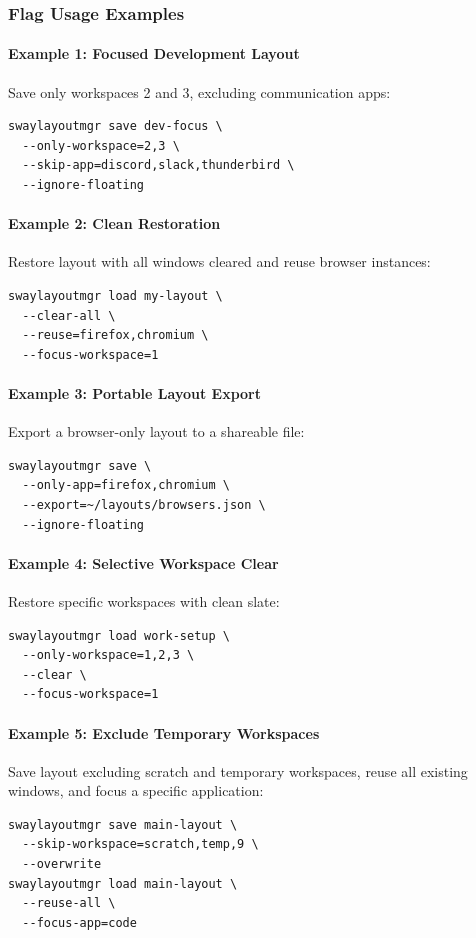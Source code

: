 \subsubsection{Flag Usage Examples}

\paragraph{Example 1: Focused Development Layout}
Save only workspaces 2 and 3, excluding communication apps:
\begin{verbatim}
swaylayoutmgr save dev-focus \
  --only-workspace=2,3 \
  --skip-app=discord,slack,thunderbird \
  --ignore-floating
\end{verbatim}

\paragraph{Example 2: Clean Restoration}
Restore layout with all windows cleared and reuse browser instances:
\begin{verbatim}
swaylayoutmgr load my-layout \
  --clear-all \
  --reuse=firefox,chromium \
  --focus-workspace=1
\end{verbatim}

\paragraph{Example 3: Portable Layout Export}
Export a browser-only layout to a shareable file:
\begin{verbatim}
swaylayoutmgr save \
  --only-app=firefox,chromium \
  --export=~/layouts/browsers.json \
  --ignore-floating
\end{verbatim}

\paragraph{Example 4: Selective Workspace Clear}
Restore specific workspaces with clean slate:
\begin{verbatim}
swaylayoutmgr load work-setup \
  --only-workspace=1,2,3 \
  --clear \
  --focus-workspace=1
\end{verbatim}

\paragraph{Example 5: Exclude Temporary Workspaces}
Save layout excluding scratch and temporary workspaces, reuse all existing windows, and focus a specific application:
\begin{verbatim}
swaylayoutmgr save main-layout \
  --skip-workspace=scratch,temp,9 \
  --overwrite
swaylayoutmgr load main-layout \
  --reuse-all \
  --focus-app=code
\end{verbatim}

